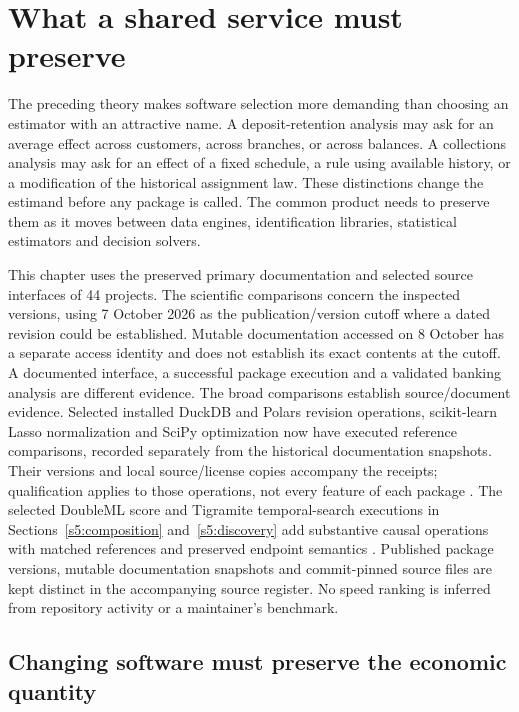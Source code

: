 \chapter{What a shared service must preserve}
\label{r3:software}

The preceding theory makes software selection more demanding than choosing
an estimator with an attractive name. A deposit-retention analysis may ask
for an average effect across customers, across branches, or across balances.
A collections analysis may ask for an effect of a fixed schedule, a rule
using available history, or a modification of the historical assignment
law. These distinctions change the estimand before any package is called.
The common product needs to preserve them as it moves between data engines,
identification libraries, statistical estimators and decision solvers.

This chapter uses the preserved primary documentation and selected source
interfaces of 44 projects. The scientific comparisons concern the inspected
versions, using 7 October 2026 as the publication/version cutoff where a
dated revision could be established. Mutable documentation accessed on
8 October has a separate access identity and does not establish its exact
contents at the cutoff. A documented interface, a successful
package execution and a validated banking analysis are different evidence.
The broad comparisons establish source/document evidence. Selected installed
DuckDB and Polars revision operations, scikit-learn Lasso normalization and
SciPy optimization now have executed reference comparisons, recorded
separately from the historical documentation snapshots. Their versions and
local source/license copies accompany the receipts; qualification applies
to those operations, not every feature of each package
\citep{runtime_duckdb,runtime_polars,runtime_scikit_learn,runtime_scipy,runtime_numpy}.
The selected DoubleML score and Tigramite temporal-search executions in
Sections~\ref{s5:composition} and~\ref{s5:discovery} add substantive causal
operations with matched references and preserved endpoint semantics
\citep{runtime_doubleml_scope,runtime_tigramite_scope}.
Published package versions, mutable documentation snapshots and
commit-pinned source files are kept distinct in the accompanying source
register. No speed ranking is inferred from repository activity or a
maintainer's benchmark.

\section{Changing software must preserve the economic quantity}
\label{r3:software-types}

